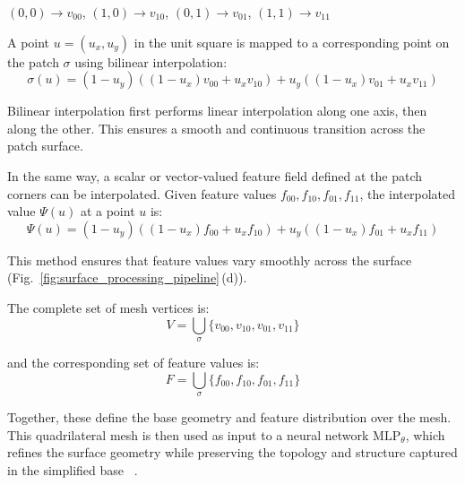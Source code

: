 \quad $(0,0) \rightarrow v_{00}$, \quad $(1,0) \rightarrow v_{10}$, \quad $(0,1) \rightarrow v_{01}$, \quad $(1,1) \rightarrow v_{11}$ 

A point $u = (u_x, u_y)$ in the unit square is mapped to a corresponding point on the patch $\sigma$ using bilinear interpolation: 
\[\sigma(u) = (1 - u_y)((1 - u_x)v_{00} + u_x v_{10}) + u_y((1 - u_x)v_{01} + u_x v_{11})\] 

Bilinear interpolation first performs linear interpolation along one axis, then along the other. 
This ensures a smooth and continuous transition across the patch surface. 

In the same way, a scalar or vector-valued feature field defined at the patch corners can be interpolated. 
Given feature values $f_{00}, f_{10}, f_{01}, f_{11}$, the interpolated value $\Psi(u)$ at a point $u$ is: 
\[\Psi(u) = (1 - u_y)((1 - u_x)f_{00} + u_x f_{10}) + u_y((1 - u_x)f_{01} + u_x f_{11})\] 

This method ensures that feature values vary smoothly across the surface (Fig.~\ref{fig:surface_processing_pipeline}\,(d)). 

The complete set of mesh vertices is: 
\[V = \bigcup_{\sigma} \{v_{00}, v_{10}, v_{01}, v_{11} \}\] 

and the corresponding set of feature values is: 
\[F = \bigcup_{\sigma} \{f_{00}, f_{10}, f_{01}, f_{11} \}\] 

Together, these define the base geometry and feature distribution over the mesh. 
This quadrilateral mesh is then used as input to a neural network $\mathrm{MLP}_\theta$, which refines the surface geometry while preserving the topology and structure captured in the simplified base ~\cite{sivaram2024}.









%    
